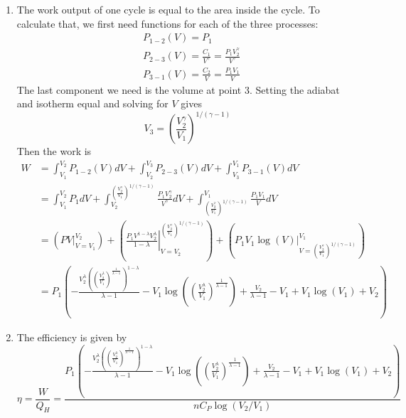 \documentclass[fleqn]{article}[12pt]
\begin{document}
\begin{enumerate}
\begin{enumerate}
        \item The work output of one cycle is equal to the area inside the cycle. To calculate that, we first need functions for each of the three processes:
        \begin{align*}
            &P_{1-2}(V) = P_1 \\
            &P_{2-3}(V) = \frac{C_1}{V^\gamma} = \frac{P_1V_2^\gamma}{V^\gamma} \\
            &P_{3-1}(V) = \frac{C_2}{V} = \frac{P_1V_1}{V}
        \end{align*}
        The last component we need is the volume at point 3. Setting the adiabat and isotherm equal and solving for $V$ gives
        \begin{equation*}
            V_3 = \left(\frac{V_2^\gamma}{V_1}\right)^{1/(\gamma-1)}
        \end{equation*}
        Then the work is
        \begin{align*}
            W &= \int_{V_1}^{V_2} P_{1-2}(V) dV + \int_{V_2}^{V_3} P_{2-3}(V) dV + \int_{V_3}^{V_1} P_{3-1}(V) dV  \\
            &= \int_{V_1}^{V_2} P_1 dV
                + \int_{V_2}^{\left(\frac{V_2^\gamma}{V_1}\right)^{1/(\gamma-1)}} \frac{P_1V_2^\gamma}{V^\gamma} dV
                + \int_{\left(\frac{V_2^\gamma}{V_1}\right)^{1/(\gamma-1)}}^{V_1} \frac{P_1V_1}{V} dV \\
            &= \left(\left.
                PV
            \right|_{V=V_1}^{V_2}\right) +
            \left(\left.
                \frac{P_1 V^{1-\lambda} V_2^\lambda}{1-\lambda}
            \right|_{V=V_2}^{\left(\frac{V_2^\gamma}{V_1}\right)^{1/(\gamma-1)}}\right) +
            \left(\left.
                P_1V_1\log(V)
            \right|_{V=\left(\frac{V_2^\gamma}{V_1}\right)^{1/(\gamma-1)}}^{V_1}\right) \\
            &= P_1 \left(-\frac{V_2^{\lambda} \left(\left(\frac{V_2^{\lambda}}{V_1}\right)^{\frac{1}{\lambda-1}}\right)^{1-\lambda}}{\lambda-1}-V_1 \log \left(\left(\frac{V_2^{\lambda}}{V_1}\right)^{\frac{1}{\lambda-1}}\right)+\frac{V_2}{\lambda-1}-V_1+V_1 \log (V_1)+V_2\right)
        \end{align*}

        \item The efficiency is given by
        \begin{equation*}
            \eta = \frac{W}{Q_H} = \frac{P_1 \left(-\frac{V_2^{\lambda} \left(\left(\frac{V_2^{\lambda}}{V_1}\right)^{\frac{1}{\lambda-1}}\right)^{1-\lambda}}{\lambda-1}-V_1 \log \left(\left(\frac{V_2^{\lambda}}{V_1}\right)^{\frac{1}{\lambda-1}}\right)+\frac{V_2}{\lambda-1}-V_1+V_1 \log (V_1)+V_2\right)}{n C_P \log(V_2/V_1)}
        \end{equation*}
    \end{enumerate}


\end{enumerate}
\end{document}
